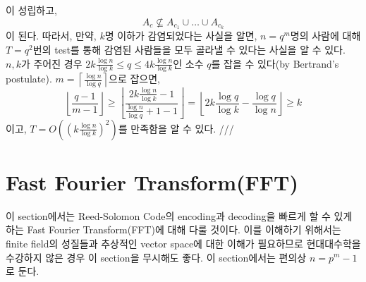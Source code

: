 \documentclass[11pt]{article}
\begin{document}
이 성립하고,
\begin{displaymath}
 A_{c}\nsubseteq A_{c_{1}}\cup\dots\cup A_{c_{k}} 
\end{displaymath}
이 된다. 따라서, 만약, $k$명 이하가 감염되었다는 사실을 알면, $n=q^{m}$명의 사람에 대해 $T=q^{2}$번의 test를 통해 감염된 사람들을 모두 골라낼 수 있다는 사실을 알 수 있다.\\
$n,k$가 주어진 경우 $2k\frac{\log n}{\log k}\leq q \leq4k\frac{\log n}{\log k}$인 소수 $q$를 잡을 수 있다(by Bertrand's postulate). $m=\left\lceil\frac{\log n}{\log q}\right\rceil$으로 잡으면, 
\begin{displaymath}
\left\lfloor\frac{q-1}{m-1}\right\rfloor \geq \left\lfloor\frac{2k\frac{\log n}{\log k}-1}{\frac{\log n}{\log q}+1-1}\right\rfloor= \left\lfloor2k\frac{\log q}{\log k}-\frac{\log q}{\log n}\right\rfloor\geq k
\end{displaymath}
이고, $T=O\left(\left(k\frac{\log n}{\log k} \right)^{2}\right)$를 만족함을 알 수 있다. ///

\section{Fast Fourier Transform(FFT)}
이 section에서는 Reed-Solomon Code의 encoding과 decoding을 빠르게 할 수 있게 하는 Fast Fourier Transform(FFT)에 대해 다룰 것이다. 이를 이해하기 위해서는 finite field의 성질들과 추상적인 vector space에 대한 이해가 필요하므로 현대대수학을 수강하지 않은 경우 이 section을 무시해도 좋다. 이 section에서는 편의상 $n=p^{m}-1$로 둔다.
\end{document}
